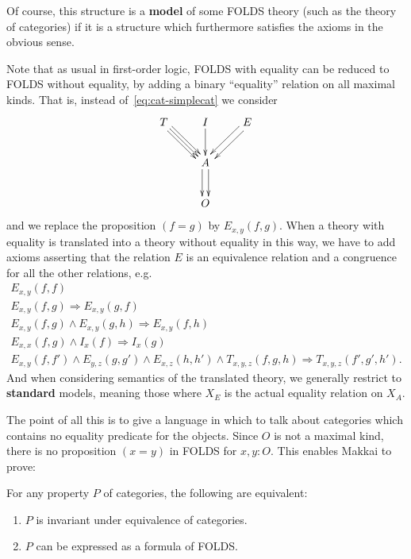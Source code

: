 \documentclass{amsart}
\begin{document}
%
Of course, this structure is a \textbf{model} of some FOLDS theory (such as the theory of categories) if it is a structure which furthermore satisfies the axioms in the obvious sense.

Note that as usual in first-order logic, FOLDS with equality can be reduced to FOLDS without equality, by adding a binary ``equality'' relation on all maximal kinds.
That is, instead of~\eqref{eq:cat-simplecat} we consider
\begin{equation}
\vcenter{\xymatrix{
  T \ar[dr] \ar@<1mm>[dr] \ar@<-1mm>[dr] & I \ar[d] & E \ar@<1mm>[dl] \ar@<-1mm>[dl] \\
  & A \ar@<1mm>[d] \ar@<-1mm>[d] \\
  & O}}\label{eq:cat-simplecateq}
\end{equation}
and we replace the proposition $(f=g)$ by $E_{x,y}(f,g)$.
When a theory with equality is translated into a theory without equality in this way, we have to add axioms asserting that the relation $E$ is an equivalence relation and a congruence for all the other relations, e.g.
\begin{gather*}
  E_{x,y} (f,f)\\
  E_{x,y}(f,g) \Rightarrow E_{x,y}(g,f)\\
  E_{x,y}(f,g) \land E_{x,y}(g,h) \Rightarrow E_{x,y}(f,h)\\
  E_{x,x}(f,g) \land I_x(f) \Rightarrow I_x(g)\\
  E_{x,y} (f,f') \land E_{y,z} (g,g') \land E_{x,z} (h,h') \land T_{x,y,z}(f,g,h) \Rightarrow T_{x,y,z}(f',g',h').
\end{gather*}
And when considering semantics of the translated theory, we generally restrict to \textbf{standard} models, meaning those where $X_E$ is the actual equality relation on $X_A$.

The point of all this is to give a language in which to talk about categories which contains no equality predicate for the objects.
Since $O$ is not a maximal kind, there is no proposition $(x=y)$ in FOLDS for $x,y:O$.
This enables Makkai to prove:

\begin{thm}
  For any property $P$ of categories, the following are equivalent:
  \begin{enumerate}
  \item $P$ is invariant under equivalence of categories.
  \item $P$ can be expressed as a formula of FOLDS.
  \end{enumerate}
\end{thm}
\end{document}
